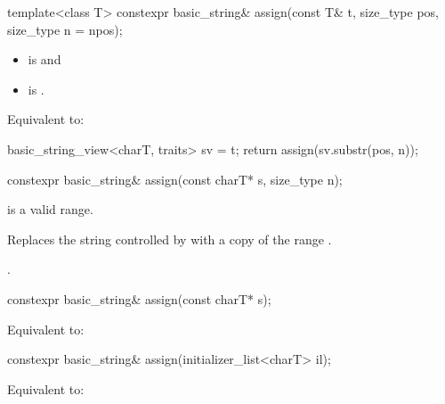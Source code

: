 %
\begin{itemdecl}
template<class T>
  constexpr basic_string& assign(const T& t, size_type pos, size_type n = npos);
\end{itemdecl}

\begin{itemdescr}
\pnum
\constraints
\begin{itemize}
\item
{} is
 and
\item
{} is
.
\end{itemize}

\pnum
\effects
Equivalent to:
\begin{codeblock}
basic_string_view<charT, traits> sv = t;
return assign(sv.substr(pos, n));
\end{codeblock}
\end{itemdescr}

%
\begin{itemdecl}
constexpr basic_string& assign(const charT* s, size_type n);
\end{itemdecl}

\begin{itemdescr}
\pnum
\expects
{} is a valid range.

\pnum
\effects
Replaces the string controlled by  with
a copy of the range .

\pnum
\returns
{}.
\end{itemdescr}

%
\begin{itemdecl}
constexpr basic_string& assign(const charT* s);
\end{itemdecl}

\begin{itemdescr}
\pnum
\effects
Equivalent to: 
\end{itemdescr}

%
\begin{itemdecl}
constexpr basic_string& assign(initializer_list<charT> il);
\end{itemdecl}

\begin{itemdescr}
\pnum
\effects
Equivalent to: 
\end{itemdescr}

